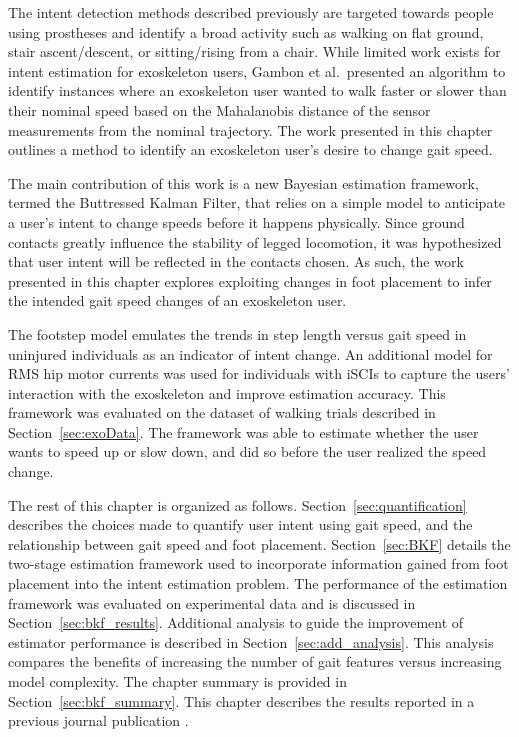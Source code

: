 The intent detection methods described previously are targeted towards people using prostheses and identify a broad activity such as walking on flat ground, stair ascent/descent, or sitting/rising from a chair. While limited work exists for intent estimation for exoskeleton users, Gambon et al.~presented an algorithm \cite{Gambon20b} to identify instances where an exoskeleton user wanted to walk faster or slower than their nominal speed based on the Mahalanobis distance of the sensor measurements from the nominal trajectory. The work presented in this chapter outlines a method to identify an exoskeleton user's desire to change gait speed. 

The main contribution of this work is a new Bayesian estimation framework, termed the Buttressed Kalman Filter, that relies on a simple model to anticipate a user's intent to change speeds before it happens physically. Since ground contacts greatly influence the stability of legged locomotion, it was hypothesized that user intent will be reflected in the contacts chosen. As such, the work presented in this chapter explores exploiting changes in foot placement to infer the intended gait speed changes of an exoskeleton user. 

The footstep model emulates the trends in step length versus gait speed in uninjured individuals as an indicator of intent change. An additional model for RMS hip motor currents was used for individuals with iSCIs to capture the users' interaction with the exoskeleton and improve estimation accuracy. This framework was evaluated on the dataset of walking trials described in Section~\ref{sec:exoData}. The framework was able to estimate whether the user wants to speed up or slow down, and did so before the user realized the speed change.

The rest of this chapter is organized as follows. Section~\ref{sec:quantification} describes the choices made to quantify user intent using gait speed, and the relationship between gait speed and foot placement. Section~\ref{sec:BKF} details the two-stage estimation framework used to incorporate information gained from foot placement into the intent estimation problem. The performance of the estimation framework was evaluated on experimental data and is discussed in Section~\ref{sec:bkf_results}. Additional analysis to guide the improvement of estimator performance is described in Section~\ref{sec:add_analysis}. This analysis compares the benefits of increasing the number of gait features versus increasing model complexity. The chapter summary is provided in Section~\ref{sec:bkf_summary}. This chapter describes the results reported in a previous journal publication \cite{karulkar2021using}.

